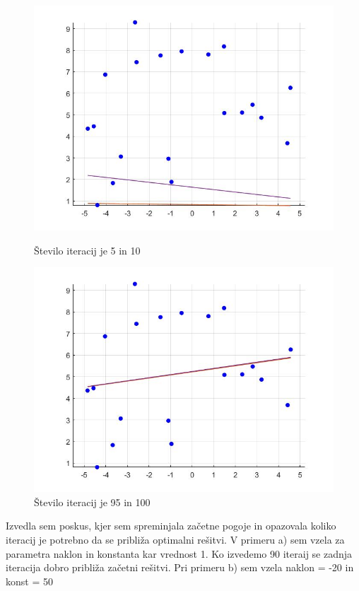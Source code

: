 \documentclass{article}
\begin{document}
\begin{figure}[!htb]
   \begin{minipage}{0.6\textwidth}
     \centering
     \includegraphics[width=1\linewidth]{premica_iter1}
     \caption{Število iteracij je 5 in 10}\label{Fig:Data1}
   \end{minipage}\hfill
   \begin{minipage}{0.6\textwidth}
     \centering
     \includegraphics[width=1\linewidth]{premica_iter2}
     \caption{Število iteracij je 95 in 100}\label{Fig:Data2}
   \end{minipage}
\end{figure}

Izvedla sem poskus, kjer sem spreminjala začetne pogoje in opazovala koliko iteracij je potrebno da se približa optimalni rešitvi. V primeru a) sem vzela za parametra naklon in konstanta kar vrednost 1. Ko izvedemo 90 iteraij se zadnja iteracija dobro približa začetni rešitvi. Pri primeru b) sem vzela naklon = -20 in konst = 50
\end{document}
